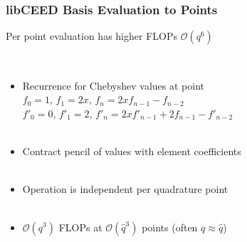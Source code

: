 \documentclass{beamer}
\begin{document}
\begin{frame}
\begin{center}
\frametitle{libCEED Basis Evaluation to Points}

Per point evaluation has higher FLOPs $\mathcal{O} \left( q^6 \right)$

~\\

\begin{itemize}

\item Recurrence for Chebyshev values at point\\

$f_0 = 1$, $f_1 = 2 x$, $f_n = 2 x f_{n - 1} - f_{n - 2}$\\

$f'_0 = 0$, $f'_1 = 2$, \hspace{0.7mm} $f'_n = 2 x f'_{n - 1} + 2 f_{n - 1} - f'_{n - 2}$\\

~\\

\item Contract pencil of values with element coefficients\\

~\\

\item Operation is independent per quadrature point\\

~\\

\item $\mathcal{O} \left( q^3 \right)$ FLOPs at $\mathcal{O} \left( \hat{q}^3 \right)$ points (often $q \approx \hat{q}$)\\

\end{itemize}

\end{center}
\end{frame}

\end{document}
